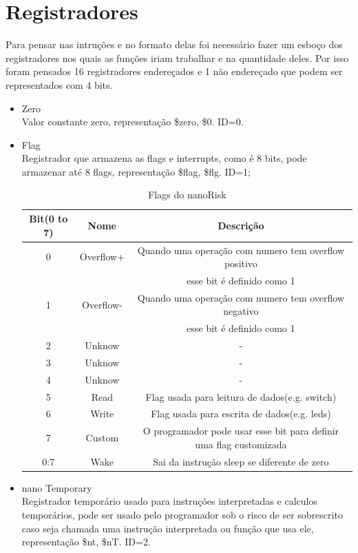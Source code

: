\documentclass[a4paper, 10pt]{article}
\begin{document}
\section{Registradores}
Para pensar nas intruções e no formato delas foi necessário fazer um esboço dos registradores nos quais as funções iriam trabalhar e na quantidade deles. Por isso foram pensados 16 registradores endereçados e 1 não endereçado que podem ser representados com 4 bits.
\begin{itemize}
	\item Zero\\
	Valor constante zero, representação \$zero, \$0. ID=0. 
	\item Flag\\
	Registrador que armazena as flags e interrupts, como é 8 bits, pode armazenar até 8 flags, representação \$flag, \$flg. ID=1;
	\begin{table}[H]
		\centering
		\caption{Flags do nanoRisk}
		\label{tab:flags}
		\begin{tabular}{c c c} %
			\hline
			Bit(0 to 7)&Nome&Descrição\\
			\hline
			0 & Overflow+&Quando uma operação com numero tem overflow positivo\\ 
			&&esse bit é definido como 1\\
			1 & Overflow-&Quando uma operação com numero tem overflow negativo\\ 
			&&esse bit é definido como 1\\
			2 & Unknow & - \\
			3 & Unknow & - \\
			4 & Unknow & - \\
			5 & Read & Flag usada para leitura de dados(e.g. switch)\\
			6 & Write & Flag usada para escrita de dados(e.g. leds)\\
			7 & Custom & O programador pode usar esse bit para definir uma flag customizada\\
			\hline
			0:7&Wake&Sai da instrução sleep se diferente de zero\\
			\hline
		\end{tabular}
	\end{table}
	\item nano Temporary\\
	Registrador temporário usado para instruções interpretadas e calculos temporários, pode ser usado pelo programador sob o risco de ser sobrescrito caso seja chamada uma instrução interpretada ou função que usa ele, representação \$nt, \$nT. ID=2. 

\end{itemize}
\end{document}
